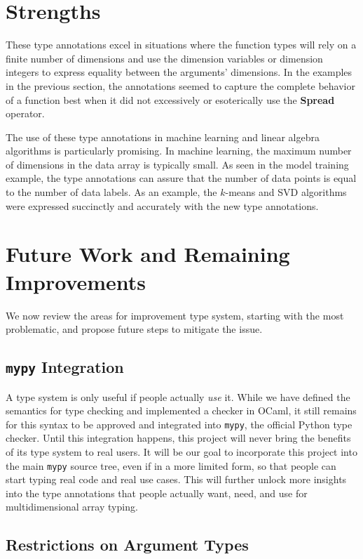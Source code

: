 \documentclass[12pt]{report}
\begin{document}
\section{Strengths}

These type annotations excel in situations where the function types will rely on a finite number of dimensions and use the dimension variables or dimension integers to express equality between the arguments' dimensions. In the examples in the previous section, the annotations seemed to capture the complete behavior of a function best when it did not excessively or esoterically use the \textbf{Spread} operator.

The use of these type annotations in machine learning and linear algebra algorithms is particularly promising. In machine learning, the maximum number of dimensions in the data array is typically small. As seen in the model training example, the type annotations can assure that the number of data points is equal to the number of data labels. As an example, the $k$-means and SVD algorithms were expressed succinctly and accurately with the new type annotations.

\section{Future Work and Remaining Improvements}

We now review the areas for improvement type system, starting with the most problematic, and propose future steps to mitigate the issue.

\subsection{\texttt{mypy} Integration}

A type system is only useful if people actually \textit{use} it. While we have defined the semantics for type checking and implemented a checker in OCaml, it still remains for this syntax to be approved and integrated into \texttt{mypy}, the official Python type checker. Until this integration happens, this project will never bring the benefits of its type system to real users. It will be our goal to incorporate this project into the main \texttt{mypy} source tree, even if in a more limited form, so that people can start typing real code and real use cases. This will further unlock more insights into the type annotations that people actually want, need, and use for multidimensional array typing.

\subsection{Restrictions on Argument Types}
\end{document}
